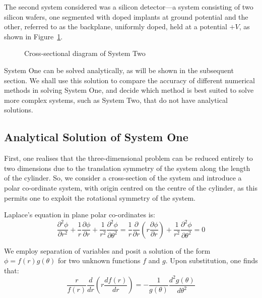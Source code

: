 \documentclass[12pt, a4paper]{article}
\newcommand{\be}{\begin{equation}}
\newcommand{\ee}{\end{equation}}
\begin{document}
The second system considered was a silicon detector---a system consisting of two
silicon wafers, one segmented with doped implants at ground potential and the other,
referred to as the backplane, uniformly doped, held at a potential $+V$, as shown
in Figure~\ref{fig:sys two}.

\begin{figure}[h!]
\begin{center}
\end{center}
\caption{Cross-sectional diagram of System Two}
\label{fig:sys two}
\end{figure}

System One can be solved analytically, as will be shown in the subsequent section. We
shall use this solution to compare the accuracy of different numerical methods in solving
System One, and decide which method is best suited to solve more complex systems, such
as System Two, that do not have analytical solutions.

\subsection{Analytical Solution of System One}

First, one realises that the three-dimensional problem can be reduced entirely to two
dimensions due to the translation symmetry of the system along the length of the
cylinder. So, we consider a cross-section of the system and introduce a polar
co-ordinate system, with origin centred on the centre of the cylinder, as this permits
one to exploit the rotational symmetry of the system.

Laplace's equation in plane polar co-ordinates is: 
%
\be
\frac{\partial^2 \phi}{\partial r^2}+\frac{1}{r}\frac{\partial \phi}{\partial r}+\frac{1}{r^2}\frac{\partial^2 \phi}{\partial \theta^2}
= \frac{1}{r}\frac{\partial}{\partial r}(r \frac{\partial \phi}{\partial r}) + \frac{1}{r^2}\frac{\partial ^2 \phi}{\partial \theta^2}
= 0
\ee

We employ separation of variables and posit a solution of the form
$\phi = f(r)g(\theta)$ for two unknown functions $f$ and $g$. Upon substitution,
one finds that:
%
\be
\frac{r}{f(r)}\frac{d}{dr}(r \frac{df(r)}{dr}) =- \frac{1}{g(\theta)}\frac{d^2 g(\theta)}{d\theta^2}
\ee
\end{document}
